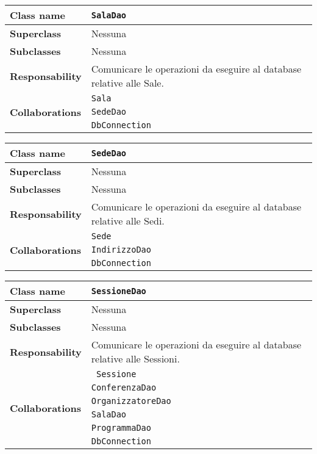\begin{table}[h!]
	\begin{tabular}{|l|l|}
		\hline 
		\textbf{Class name} & \texttt{SalaDao}
		\\ \hline
		\textbf{Superclass} & Nessuna
		\\ \hline
		\multirow{1}{*}{\textbf{Subclasses}} & Nessuna
		\\ \hline
		\textbf{Responsability} & Comunicare le operazioni da eseguire al database relative alle Sale.
		\\ \hline
		\multirow{3}{*}{\textbf{Collaborations}} & \texttt{Sala} \\ 
		& \texttt{SedeDao} \\
		& \texttt{DbConnection} \\ \hline
	\end{tabular}
\end{table}

\begin{table}[h!]
	\begin{tabular}{|l|l|}
		\hline 
		\textbf{Class name} & \texttt{SedeDao}
		\\ \hline
		\textbf{Superclass} & Nessuna
		\\ \hline
		\multirow{1}{*}{\textbf{Subclasses}} & Nessuna
		\\ \hline
		\textbf{Responsability} & Comunicare le operazioni da eseguire al database relative alle Sedi.
		\\ \hline
		\multirow{3}{*}{\textbf{Collaborations}} & \texttt{Sede} \\ 
		& \texttt{IndirizzoDao} \\
		& \texttt{DbConnection} \\ \hline
	\end{tabular}
\end{table}

\begin{table}[h!]
	\begin{tabular}{|l|l|}
		\hline 
		\textbf{Class name} & \texttt{SessioneDao}
		\\ \hline
		\textbf{Superclass} & Nessuna
		\\ \hline
		\multirow{1}{*}{\textbf{Subclasses}} & Nessuna
		\\ \hline
		\textbf{Responsability} & Comunicare le operazioni da eseguire al database relative alle Sessioni.
		\\ \hline
		\multirow{6}{*}{\textbf{Collaborations}} &\texttt{ Sessione} \\ 
		& \texttt{ConferenzaDao} \\
		& \texttt{OrganizzatoreDao} \\
		& \texttt{SalaDao} \\
		& \texttt{ProgrammaDao} \\
		& \texttt{DbConnection} \\ \hline
	\end{tabular}
\end{table}

